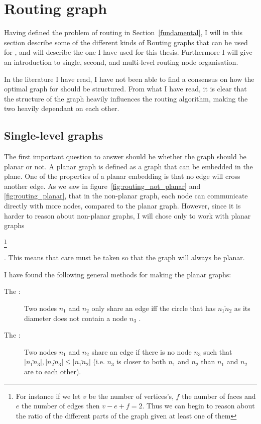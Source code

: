 \section{Routing graph}
Having defined the problem of routing in Section~\ref{fundamental}, I will in this section describe some of the different kinds of Routing graphs that can be used for \manet, and will describe the one I have used for this thesis. Furthermore I will give an introduction to single, second, and multi-level routing node organisation. 

In the literature I have read, I have not been able to find a consensus on how the optimal graph for \manet should be structured. From what I have read, it is clear that the structure of the graph heavily influences the routing algorithm, making the two heavily dependant on each other.

\subsection{Single-level graphs}
\label{single_level}
The first important question to answer should be whether the graph should be planar or not. A planar graph is defined as a graph that can be embedded in the plane. One of the properties of a planar embedding is that no edge will cross another edge. As we saw in figure~\ref{fig:routing_not_planar} and \ref{fig:routing_planar}, that in the non-planar graph, each node can communicate directly with more nodes, compared to the planar graph. However, since it is harder to reason about non-planar graphs, I will chose only to work with planar graphs 
\begin{planar-footnote}
\footnote{For instance if we let $v$ be the number of vertices's, $f$ the number of faces and $e$ the number of edges then $v - e + f = 2$. Thus we can begin to reason about the ratio of the different parts of the graph given at least one of them}
\end{planar-footnote} 
. This means that care must be taken so that the graph will always be planar.

I have found the following general methods for making the planar graphs:
\begin{description}
\item[The \gabe:] Two nodes $n_1$ and $n_2$ only share an edge iff the circle that has $\overline{n_1n_2}$ as its diameter does not contain a node $n_3$ \cite{gopher, gpsr}. 
\item[The \rng:] Two nodes $n_1$ and $n_2$ share an edge if there is no node $n_3$ such that $|\overline{n_1n_3}|, |\overline{n_2n_3}| \leq |\overline{n_1n_2}|$ (i.e. $n_3$ is closer to both $n_1$ and $n_2$ than $n_1$ and $n_2$ are to each other). \cite{gpsr, RNG}
\end{description}

